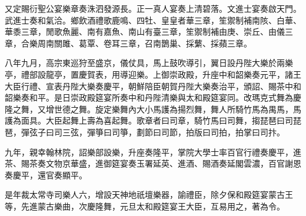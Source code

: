 \begin{pinyinscope}
又定賜衍聖公宴樂章奏洙泗發源長。正一真人宴奏上清碧落。文進士宴奏啟天門。武進士奏和氣洽。鄉飲酒禮歌鹿鳴、四牡、皇皇者華三章，笙禦制補南陔、白華、華黍三章，閒歌魚麗、南有嘉魚、南山有臺三章，笙禦制補由庚、崇丘、由儀三章，合樂周南關雎、葛覃、卷耳三章，召南鵲巢、採蘩、採蘋三章。

八年九月，高宗東巡狩至盛京，儀仗具，馬上鼓吹導引，翼日設丹陛大樂於兩樂亭，禮部設龍亭，置慶賀表，用導迎樂。上御崇政殿，升座中和韶樂奏元平，諸王大臣行禮、宣表丹陛大樂奏慶平，朝鮮陪臣朝賀丹陛大樂奏治平，頒詔、賜茶中和韶樂奏和平。是日崇政殿筵宴所奏中和丹陛清樂與太和殿筵宴同。改瑪克式舞為慶隆之舞，又增世德之舞。旋定樂舞內大小馬護為揚烈舞，舞人所騎竹馬為禺馬，馬護為面具。大臣起舞上壽為喜起舞。歌章者曰司章，騎竹馬曰司舞，搊琵琶曰司琵琶，彈弦子曰司三弦，彈箏曰司箏，劃節曰司節，拍版曰司拍，拍掌曰司抃。

九年，親幸翰林院，詔樂部設樂，升座奏隆平，掌院大學士率百官行禮奏慶平，進茶、賜茶奏文物京華盛，進御筵宴奏玉署延英、進酒、賜酒奏延閣雲濃，百官謝恩奏慶平，還官奏顯平。

是年裁太常寺司樂人六，增設天神地祇壇樂器，諭禮臣，除夕保和殿筵宴蒙古王等，先進蒙古樂曲，次慶隆舞，元旦太和殿筵宴王大臣，互易用之，著為令。


\end{pinyinscope}
